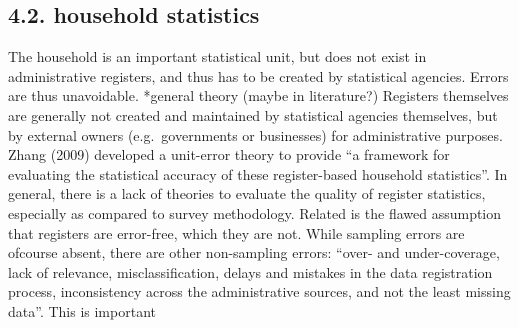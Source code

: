 \documentclass[
]{article}
\begin{document}
\hypertarget{household-statistics}{%
\subsection{4.2. household statistics}\label{household-statistics}}

The household is an important statistical unit, but does not exist in
administrative registers, and thus has to be created by statistical
agencies. Errors are thus unavoidable. *general theory (maybe in
literature?) Registers themselves are generally not created and
maintained by statistical agencies themselves, but by external owners
(e.g.~governments or businesses) for administrative purposes. Zhang
(2009) developed a unit-error theory to provide ``a framework for
evaluating the statistical accuracy of these register-based household
statistics''. In general, there is a lack of theories to evaluate the
quality of register statistics, especially as compared to survey
methodology. Related is the flawed assumption that registers are
error-free, which they are not. While sampling errors are ofcourse
absent, there are other non-sampling errors: ``over- and under-coverage,
lack of relevance, misclassification, delays and mistakes in the data
registration process, inconsistency across the administrative sources,
and not the least missing data''. This is important
\end{document}
